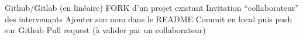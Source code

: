 Github/Gitlab (en linéaire)
FORK d’un projet existant 
Invitation “collaborateur” des intervenants
Ajouter son nom dans le README
Commit en local puis push sur Github 
Pull request (à valider par un collaborateur)
